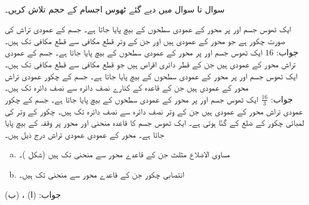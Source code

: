 \\
سوال  تا سوال  میں دیے گئے ٹھوس اجسام کے حجم تلاش کریں۔

ایک ٹھوس جسم  اور  پر   محور کے عمودی سطحوں کے بیچ پایا جاتا ہے۔ جسم کے عمودی تراش کی صورت چکور ہے جو   محور کے عمودی ہیں اور جن کے وتر قطع مکافی  سے قطع مکافی  تک ہیں۔\\
جواب:\quad
$16$
ایک ٹھوس جسم  اور  پر   محور کے عمودی سطحوں کے بیچ پایا جاتا ہے۔ جسم کے عمودی تراش  محور کے عمودی ہیں جن کے قطر دائری اقراص ہیں جو قطع مکافی  سے قطع مکافی  تک ہیں۔   
ایک ٹھوس جسم  اور  پر   محور کے عمودی سطحوں کے بیچ پایا جاتا ہے۔ جسم کے چکور عمودی تراش  محور کے عمودی ہیں جن کے قاعدہ کے کنارے نصف دائرہ  سے نصف دائرہ  تک ہیں۔ \\
جواب:\quad
$\tfrac{16}{3}$  
ایک ٹھوس جسم  اور  پر   محور کے عمودی سطحوں کے بیچ پایا جاتا ہے۔ جسم کے چکور عمودی تراش  محور کے عمودی ہیں جن کے وتر نصف دائرہ  سے نصف دائرہ  تک ہیں۔ چکور کے وتر کی لمبائی چکور کے ضلع کے  گنّا ہوتی ہے۔
ایک ٹھوس جسم کا قاعدہ منحنی  اور  محور پر وقفہ   کے بیچ پایا جاتا ہے۔  محور کے عمودی عمودی تراش درج ذیل ہیں۔
\begin{enumerate}[a.]
\item
مساوی الاضلاع  مثلث جن کے قاعدے  محور سے منحنی تک ہیں (شکل )۔
\item
انتصابی چکور جن کے قاعدے  محور سے منحنی تک ہیں۔
\end{enumerate}
جواب:\quad
(ا) ، (ب) 
